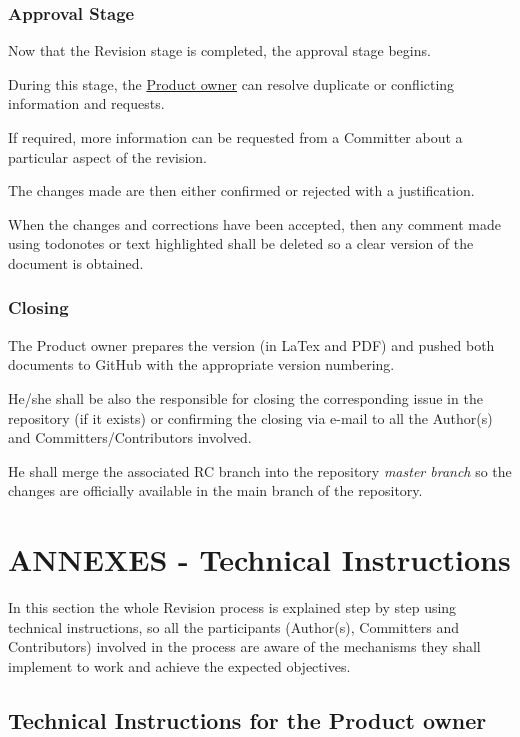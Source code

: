 \documentclass{template/openetcs_article}
\begin{document}
\subsubsection{Approval Stage}

Now that the Revision stage is completed, the approval stage begins. 

During this stage, the \underline{Product owner} can resolve duplicate or conflicting information and requests.

If required, more information can be requested from a Committer about a particular aspect of the revision. 

The changes made are then either confirmed or rejected with a justification.

When the changes and corrections have been accepted, then any comment made using todonotes or text highlighted shall be deleted so a clear version of the document is obtained.

\subsubsection{Closing}

The Product owner prepares the version (in LaTex and PDF) and pushed both documents to GitHub with the appropriate version numbering. 

He/she shall be also the responsible for closing the corresponding issue in the repository (if it exists) or confirming the closing via e-mail to all the Author(s) and Committers/Contributors involved. 

He shall merge the associated RC branch into the repository {\it master branch} so the changes are officially available in the main branch of the repository.


\section{ANNEXES - Technical Instructions}

In this section the whole Revision process is explained step by step using technical instructions, so all the participants (Author(s), Committers and Contributors) involved in the process are aware of the mechanisms they shall implement to work and achieve the expected objectives. 

\subsection{Technical Instructions for the Product owner}
\end{document}
